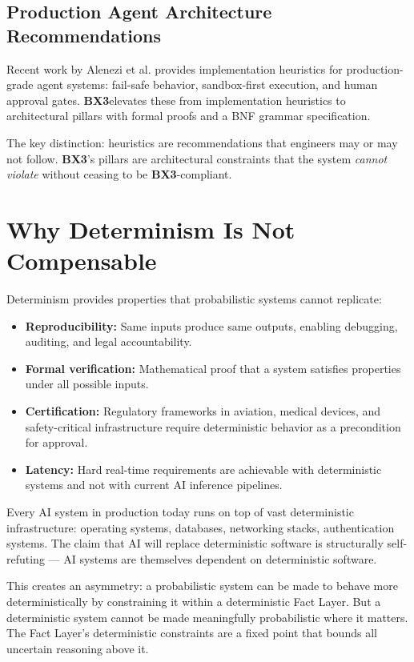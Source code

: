 \documentclass[12pt]{article}
\newcommand{\bxthree}{\textbf{BX3}}
\begin{document}
\subsection{Production Agent Architecture Recommendations}
Recent work by Alenezi et al. \cite{alenezi2026} provides implementation heuristics for production-grade agent systems: fail-safe behavior, sandbox-first execution, and human approval gates. \bxthree elevates these from implementation heuristics to architectural pillars with formal proofs and a BNF grammar specification.

The key distinction: heuristics are recommendations that engineers may or may not follow. \bxthree's pillars are architectural constraints that the system \textit{cannot violate} without ceasing to be \bxthree-compliant.

\section{Why Determinism Is Not Compensable}
\label{sec:determinism}

Determinism provides properties that probabilistic systems cannot replicate:

\begin{itemize}[noitemsep]
\item \textbf{Reproducibility:} Same inputs produce same outputs, enabling debugging, auditing, and legal accountability.
\item \textbf{Formal verification:} Mathematical proof that a system satisfies properties under all possible inputs.
\item \textbf{Certification:} Regulatory frameworks in aviation, medical devices, and safety-critical infrastructure require deterministic behavior as a precondition for approval.
\item \textbf{Latency:} Hard real-time requirements are achievable with deterministic systems and not with current AI inference pipelines.
\end{itemize}

Every AI system in production today runs on top of vast deterministic infrastructure: operating systems, databases, networking stacks, authentication systems. The claim that AI will replace deterministic software is structurally self-refuting --- AI systems are themselves dependent on deterministic software.

This creates an asymmetry: a probabilistic system can be made to behave more deterministically by constraining it within a deterministic Fact Layer. But a deterministic system cannot be made meaningfully probabilistic where it matters. The Fact Layer's deterministic constraints are a fixed point that bounds all uncertain reasoning above it.
\end{document}
